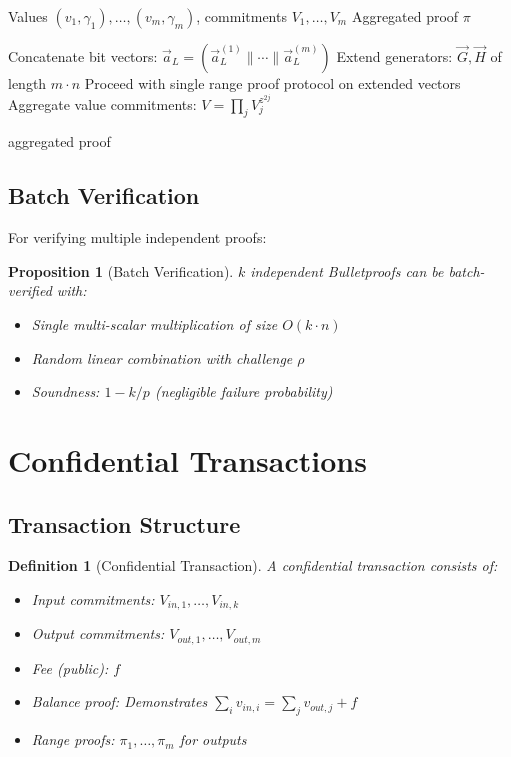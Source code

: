 \documentclass[11pt,a4paper]{article}
\newtheorem{definition}[theorem]{Definition}
\newtheorem{proposition}[theorem]{Proposition}
\begin{document}
\begin{algorithm}
\caption{Aggregated Range Proof}
\label{alg:aggregate}
\begin{algorithmic}[1]
\Require Values $(v_1, \gamma_1), \ldots, (v_m, \gamma_m)$, commitments $V_1, \ldots, V_m$
\Ensure Aggregated proof $\pi$

\State Concatenate bit vectors: $\vec{a}_L = (\vec{a}_L^{(1)} \| \cdots \| \vec{a}_L^{(m)})$
\State Extend generators: $\vec{G}, \vec{H}$ of length $m \cdot n$
\State Proceed with single range proof protocol on extended vectors
\State Aggregate value commitments: $V = \prod_j V_j^{z^{2j}}$

\State \Return aggregated proof
\end{algorithmic}
\end{algorithm}

\subsection{Batch Verification}

For verifying multiple independent proofs:

\begin{proposition}[Batch Verification]
$k$ independent Bulletproofs can be batch-verified with:
\begin{itemize}
    \item Single multi-scalar multiplication of size $O(k \cdot n)$
    \item Random linear combination with challenge $\rho$
    \item Soundness: $1 - k/p$ (negligible failure probability)
\end{itemize}
\end{proposition}

\section{Confidential Transactions}
\label{sec:confidential-tx}

\subsection{Transaction Structure}

\begin{definition}[Confidential Transaction]
A confidential transaction consists of:
\begin{itemize}
    \item Input commitments: $V_{in,1}, \ldots, V_{in,k}$
    \item Output commitments: $V_{out,1}, \ldots, V_{out,m}$
    \item Fee (public): $f$
    \item Balance proof: Demonstrates $\sum_{i} v_{in,i} = \sum_j v_{out,j} + f$
    \item Range proofs: $\pi_1, \ldots, \pi_m$ for outputs
\end{itemize}
\end{definition}
\end{document}
